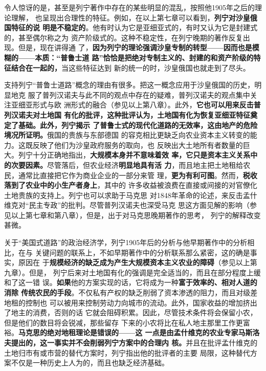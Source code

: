 令人惊讶的是，甚至是列宁著作中存在的某些明显的混乱，按照他1905年之后的理论理解，
也呈现出合理性的特征。例如，在以上第七章可以看到，\textbf{列宁对沙皇俄国特征的说
  明是不稳定的}。他有时认为它是亚细亚式的，有时又认为它是封建式的，甚至偶尔称之为
资产阶级式的。这种不稳定性，在列宁晚期的著作反复出现。但是，现在讲得通
了，\textbf{因为列宁的理论强调沙皇专制的转型——因而也是模糊的——本质：“普鲁士道
  路”恰恰是把绝对专制主义的、封建的和资产阶级的特征结合在一起的，}当这些特征达到
新的统一的时，沙皇俄国也就走到了尽头。

支持列宁“普鲁士道路”概念的理由有很多。把这一概念应用于沙皇俄国的历史，明显地克
服了普列汉诺夫与此不同的观点中存在的疑难，普列汉诺夫的观点集中关注亚细亚形式与欧
洲形式的融合（参见以上第八章）。此外，\textbf{它也可以用来反击普列汉诺夫对土地国
  有化的批评，这种批评认为，土地国有化为恢复亚细亚特征奠定了基础。此外，列宁揭示
  了普鲁士式的现代化道路的无效率，这由地产的危险境况所证明。}俄国的贵族与东部德国
的容克相比更缺乏向农业资本主义转变的能力。这既反映了他们为沙皇政府服务的取向，也
反映出大土地所有者数量的巨大。列宁十分正确地指出，\textbf{大规模本身并不意味着效
  率，它只是资本主义关系中的次要因素。}尽管落后，但农业经济\textbf{明显地具有活
  力}，而且地主把土地租给农民，通常比直接把它作为商业企业的一部分来管
理，\textbf{更为有利可图}。然而，\textbf{税收落到了农业中的小生产者身上}，其中的
许多收益被浪费在直接或间接的对官僚化土地贵族的支持上。列宁也可以求助于马克思
对1848年革命的论述，来反击孟什维克对“民主专政”的批判。尽管普列汉诺夫也深受马克
思这方面见解的影响（参见以上第七章和第八章），但是，出于对马克思晚期著作的思考，
列宁的解释改变甚微。

关于“美国式道路”的政治经济学，列宁1905年后的分析与他早期著作中的分析相比，在与
关键问题的联系上，不如早期著作中的分析联系那么紧密，这的确是事实，原因在
于\textbf{规模经济的缺乏成为产生大规模资本主义农业的障碍}（参见以上第九章）。但是，
列宁后来对土地国有化的强调是完全适当的，而且在部分程度上缓和了这一错
误。\textbf{如果}他的方案实现的话，它将成为一种\textbf{富于效率的、相对人道的消除
  传统农民的手段}。不仅私有产权的缺乏削弱了资本渗透的阻力，而且对级差地租的控制也
可以被用来控制劳动力向城市的流动。此外，国家收益的增加挤出了地主的消费，否则的话
它就会阻碍积累。因此，尽管技术条件将会保留小农，但是他们的数目将会锐减，那些留存
下来的小农将比在私人地主那里工作更富裕。\textbf{马克思的绝对地租理论是错误的——这
  一点是由孟什维克的农业专家马斯洛夫提出的，这一事实并不会削弱列宁方案中的合理内
  核。}并且在批评孟什维克的土地归市有或市营的替代方案时，列宁指出他的批评者的主要
局限，这种替代方案不仅是一种历史上人为的，而且也缺乏经济基础。

